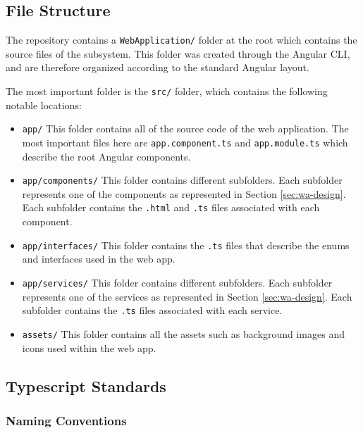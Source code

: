 \documentclass{article}
\begin{document}
    \subsection{File Structure}
    \label{sec:wa-struc}

    The repository contains a \texttt{WebApplication/} folder at the root which
    contains the source files of the subsystem. This folder was created through
    the Angular CLI, and are therefore organized according to the standard
    Angular layout.

    The most important folder is the \texttt{src/} folder, which contains the
    following notable locations:

    \begin{itemize}
        \item \texttt{app/}
            \subitem This folder contains all of the source code of the web
            application. The most important files here are
            \texttt{app.component.ts} and \texttt{app.module.ts} which describe
            the root Angular components.
        \item \texttt{app/components/}
            \subitem This folder contains different subfolders. Each subfolder
            represents one of the components as represented in Section
            \ref{sec:wa-design}. Each subfolder contains the \texttt{.html} and
            \texttt{.ts} files associated with each component.
        \item \texttt{app/interfaces/}
            \subitem This folder contains the \texttt{.ts} files that describe
            the enums and interfaces used in the web app.
        \item \texttt{app/services/}
            \subitem This folder contains different subfolders. Each subfolder
            represents one of the services as represented in Section
            \ref{sec:wa-design}. Each subfolder contains the \texttt{.ts} files
            associated with each service.
        \item \texttt{assets/}
            \subitem This folder contains all the assets such as background
            images and icons used within the web app.
    \end{itemize}

    \subsection{Typescript Standards}
    \label{sec:typescript}

    \subsubsection{Naming Conventions}
    \label{sec:typescript-nc}
\end{document}
